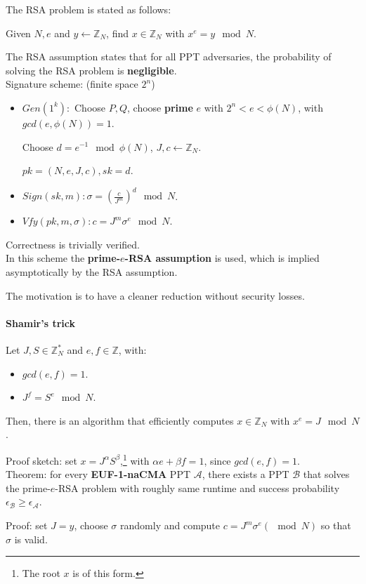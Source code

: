 \documentclass[oneside]{book}
\newcommand{\Z}[0]{\mathbb{Z}}
\newcommand{\cA}[0]{\mathcal{A}}
\newcommand{\cB}[0]{\mathcal{B}}
\begin{document}
The RSA problem is stated as follows:

Given $N, e$ and $y \leftarrow \Z_N$, find $x \in \Z_N$ with $x^e = y \mod N$.

The RSA assumption states that for all PPT adversaries, the probability of solving the RSA problem is \textbf{negligible}.\\

Signature scheme: (finite space $2^n$)
\begin{itemize}
    \item $Gen(1^k):$ Choose $P, Q$, choose \textbf{prime} $e$ with $2^n < e < \phi(N)$, with $gcd(e, \phi(N)) = 1$.
    
    Choose $d = e^{-1} \mod \phi(N)$, $J, c \leftarrow \Z_N$.
    
    $pk = (N, e, J, c), sk = d$.
    \item $Sign(sk, m): \sigma = (\frac{c}{J^m})^d \mod N$.
    \item $Vfy(pk, m, \sigma): c = J^m\sigma^e \mod N$.
\end{itemize}

Correctness is trivially verified.\\

In this scheme the \textbf{prime-$e$-RSA assumption} is used, which is implied asymptotically by the RSA assumption.

The motivation is to have a cleaner reduction without security losses.

\paragraph{Shamir's trick} Let $J, S \in \Z^*_N$ and $e, f \in \Z$, with:
\begin{itemize}
    \item $gcd(e,f) = 1$.
    \item $J^f = S^e \mod N$.
\end{itemize}
Then, there is an algorithm that efficiently computes $x \in \Z_N$ with $x^e = J \mod N$.

Proof sketch: set $x = J^\alpha S^\beta$,\footnote{The root $x$ is of this form.} with $\alpha e+\beta f = 1$, since $gcd(e,f) = 1$.\\

Theorem: for every \textbf{EUF-1-naCMA} PPT $\cA$, there exists a PPT $\cB$ that solves the prime-$e$-RSA problem with roughly same runtime and success probability $\epsilon_\cB \ge \epsilon_\cA$.

Proof: set $J = y$, choose $\sigma$ randomly and compute $c = J^m\sigma^e (\mod N)$ so that $\sigma$ is valid.
\end{document}

